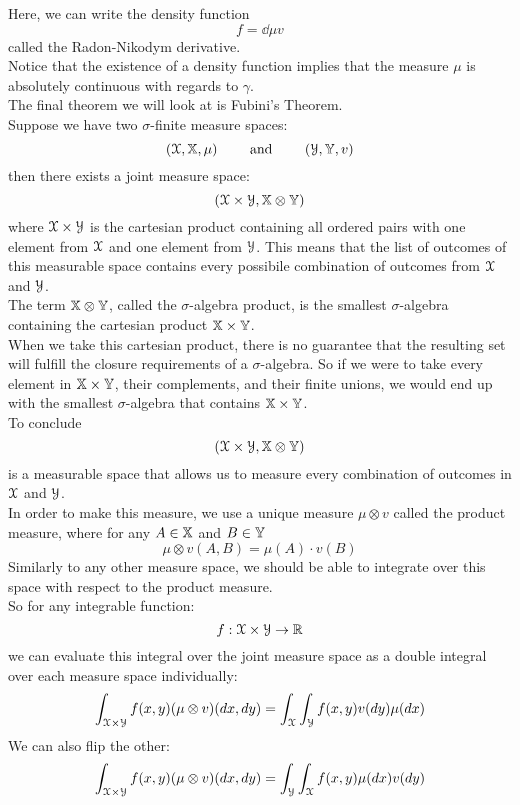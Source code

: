 \documentclass[12pt]{article}
\begin{document}
    Here, we can write the density function
    \[ f = \dd{\mu}{v} \]
    called the Radon-Nikodym derivative. \\

    Notice that the existence of a 
    density function implies that the measure
    $\mu$ is absolutely continuous
    with regards to $\gamma$. \\

    The final theorem we will look
    at is Fubini's Theorem. \\
    Suppose we have two $\sigma$-finite
    measure spaces:
    \[ (\mathcal{X}, \mathbb{X}, \mu)
    \qquad \text{ and } \qquad (\mathcal{Y}, \mathbb{Y}, v) \]
    then there exists a joint measure
    space:
    \[ (\mathcal{X} \times \mathcal{Y}, 
    \mathbb{X} \otimes \mathbb{Y}) \]
    where $\mathcal{X} \times \mathcal{Y}$
    is the cartesian product containing
    all ordered pairs with one element
    from $\mathcal{X}$ and one element from $\mathcal{Y}$.
    This means that the list of outcomes
    of this measurable space contains
    every possibile combination of outcomes
    from $\mathcal{X}$ and $\mathcal{Y}$. \\
    The term $\mathbb{X} \otimes \mathbb{Y}$,
    called the $\sigma$-algebra product,
    is the smallest $\sigma$-algebra
    containing the cartesian product
    $\mathbb{X} \times \mathbb{Y}$. \\
    When we take this cartesian product,
    there is no guarantee that the resulting
    set will fulfill the closure requirements
    of a $\sigma$-algebra.
    So if we were to take every element in
    $\mathbb{X} \times \mathbb{Y}$, their complements,
    and their finite unions,
    we would end up with the smallest $\sigma$-algebra
    that contains $\mathbb{X} \times \mathbb{Y}$. \\
    To conclude 
    \[ (\mathcal{X} \times \mathcal{Y}, \mathbb{X} \otimes \mathbb{Y}) \]
    is a measurable space that allows us
    to measure every combination of outcomes
    in $\mathcal{X}$ and $\mathcal{Y}$. \\
    In order to make this measure,
    we use a unique measure $\mu \otimes v$
    called the product measure,
    where for any $A \in \mathbb{X}$ and
    $B \in \mathbb{Y}$
    \[ \mu \otimes v(A, B) =
    \mu(A) \cdot v(B)  \]
    Similarly to any other measure space,
    we should be able to integrate
    over this space with respect to
    the product measure. \\
    So for any integrable function:
    \[ f:\mathcal{X} \times \mathcal{Y}
    \to \mathbb{R} \]
    we can evaluate this integral
    over the joint measure space
    as a double integral
    over each measure space individually:
    \[ \int_{\mathcal{X} \times \mathcal{Y}}
    f(x,y)(\mu \otimes v)(dx, dy)
    = \int_{\mathcal{X}}  \int_{\mathcal{Y}}
    f(x,y)v(dy)\mu(dx) \]
    We can also flip the other:
    \[ \int_{\mathcal{X} \times \mathcal{Y}}
    f(x,y)(\mu \otimes v)(dx, dy)
    = \int_{\mathcal{Y}}  \int_{\mathcal{X}}
    f(x,y)\mu(dx)v(dy) \] \\
\end{document}
